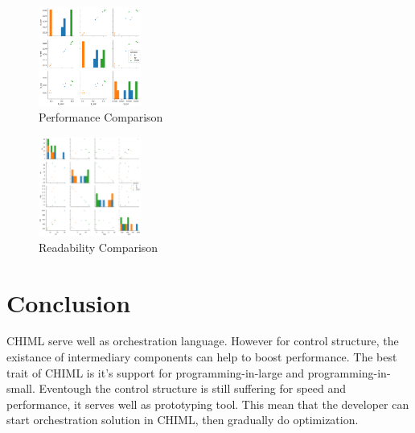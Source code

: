 \documentclass[conference]{IEEEtran}
\begin{document}
\begin{figure}
	\centering
	\includegraphics[width=0.3\textwidth]
		{benchmark/benchmark.png}
	\caption{Performance Comparison}
	\label{fig:performanceComparison}
\end{figure}


\begin{figure}
	\centering
	\includegraphics[width=0.3\textwidth]
		{benchmark/readability.png}
	\caption{Readability Comparison}
	\label{fig:readabilityComparison}
\end{figure}

\section{Conclusion}

CHIML serve well as orchestration language. However for control structure, the existance of intermediary components can help to boost performance. The best trait of CHIML is it's support for programming-in-large and programming-in-small. Eventough the control structure is still suffering for speed and performance, it serves well as prototyping tool. This mean that the developer can start orchestration solution in CHIML, then gradually do optimization.




\ifCLASSOPTIONcaptionsoff
  \newpage
\fi




\end{document}

